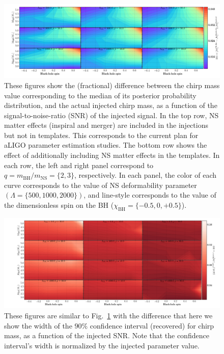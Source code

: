 \documentclass[aps,prd,amsmath,floats,floatfix, twocolumn,
superscriptaddress,nofootinbib,showpacs]{revtex4-1}
\begin{document}
\begin{figure}
\centering 
\includegraphics[trim={{0.2\columnwidth} 0 0 0},width=2.1\columnwidth]{plots-TN/TN_MchirpBiases_Lambda_SNR.pdf}
\caption{These figures show the (fractional) difference between the chirp mass 
value corresponding to the median of its posterior probability distribution,
and the actual injected chirp mass,
as a function of the signal-to-noise-ratio (SNR) of the injected signal.
In the top row, NS matter effects (inspiral and merger) are included in the
injections but not in templates. This corresponds to the current 
plan for aLIGO parameter estimation studies. The bottom row shows the effect
of additionally including NS matter effects in the templates.
% 
In each row, the left and right panel correspond to 
$q=m_\mathrm{BH}/m_\mathrm{NS}=\{2,3\}$, respectively. 
In each panel, the color of each curve corresponds to the value of NS 
deformability parameter $(\Lambda=\{500,1000,2000\})$, 
and line-style corresponds to the value of
the dimensionless spin on the BH ($\chi_\mathrm{BH}=\{-0.5,0,+0.5\}$).
}
\label{fig:TNT_chirpMassBias_vs_SNR_q23}
\end{figure}
% 
\begin{figure}
\centering
\includegraphics[trim={{0.4\columnwidth} 0 0 0},width=2.2\columnwidth]{plots-TN/TN_MchirpCIWidths90_0_Lambda_SNR.pdf}
\caption{These figures are similar to Fig.~\ref{fig:TNT_chirpMassBias_vs_SNR_q23}
with the difference that here we show the width of the $90\%$ confidence 
interval (recovered) for chirp mass, as a function of the injected SNR. 
Note that the confidence interval's width is normalized by the injected
parameter value.
}
\label{fig:TNT_chirpMassCIWidth90_vs_SNR_q23}
\end{figure}
% 
\newpage
\newpage
\end{document}
